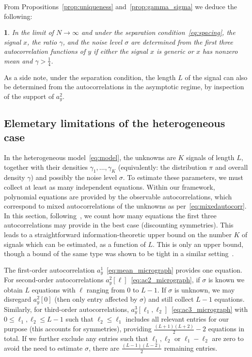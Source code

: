\documentclass[12pt]{article}
\newcommand{\1}{\mathbf{1}}
\newcommand{\TODO}[1]{{\color{red}{[#1]}}}
\theoremstyle{plain}
\theoremstyle{definition}
\theoremstyle{remark}
\theoremstyle{plain}
\theoremstyle{remark}
\theoremstyle{plain}
\newtheorem{corollary}[thm]{\protect\corollaryname}
\theoremstyle{plain}
\theoremstyle{plain}
\providecommand{\corollaryname}{Corollary}
\numberwithin{equation}{section}
\begin{document}
From Propositions~\ref{prop:uniqueness} and~\ref{prop:gamma_sigma} we   deduce the following:
\begin{corollary}
	In the limit of $N\to \infty$ and under the separation condition~\eqref{eq:spacing}, the signal $x$, the ratio $\gamma$, and the noise level $\sigma$ are determined from the first three autocorrelation functions of $y$ if either the signal $x$ is generic or $x$ has nonzero mean  and $\gamma > \frac{1}{4}$.
\end{corollary}

As a side note, under the separation condition, the length $L$ of the signal can also be determined from the autocorrelations in the asymptotic regime, by inspection of the support of $a_y^2$.


\subsection{Elemetary limitations of the heterogeneous case}
\label{sec:heterogeneity}

\TODO{Check and specify if this holds for both models}
\TODO{Did we define densities $\gamma_k$?}

In the heterogeneous model~\eqref{eq:model}, the unknowns are $K$ signals of length $L$, together with their densities $\gamma_1, \ldots, \gamma_K$ (equivalently: the distribution $\pi$ and overall density $\gamma$) and possibly the noise level $\sigma$. To estimate these parameters, we must collect at least as many independent equations. Within our framework, polynomial equations are provided by the observable autocorrelations, which correspond to mixed autocorrelations of the unknowns as per~\eqref{eq:mixedautocorr}. In this section, following~\cite{boumal2017heterogeneous}, we count how many equations the first three autocorrelations may provide in the best case (discounting symmetries). This leads to a straightforward information-theoretic upper bound on the number $K$ of signals which can be estimated, as a function of $L$. This is only an upper bound, though a bound of the same type was shown to be tight in a similar setting~\cite{bandeira2017estimation}.

The first-order autocorrelation $a_y^1$~\eqref{eq:mean_micrograph} provides one equation. For second-order autocorrelations $a_y^2[\ell]$~\eqref{eq:ac2_micrograph}, if $\sigma$ is known we obtain $L$ equations with $\ell$ ranging from 0 to $L-1$. If $\sigma$ is unknown, we may disregard $a_y^2[0]$ (then only entry affected by $\sigma$) and still collect $L-1$ equations. Similarly, for third-order autocorrelations, $a_y^3[\ell_1, \ell_2]$~\eqref{eq:ac3_micrograph} with $0 \leq \ell_1, \ell_2 \leq L-1$ such that $\ell_2 \leq \ell_1$ includes all relevant entries for our purpose (this accounts for symmetries), providing $\frac{(L+1)(L+2)}{2}-2$ equations in total. 
If we further exclude any entries such that $\ell_1, \ell_2$ or $\ell_1 - \ell_2$ are zero to avoid the need to estimate $\sigma$, there are $\frac{(L-1)(L-2)}{2}$ remaining entries.
\end{document}
